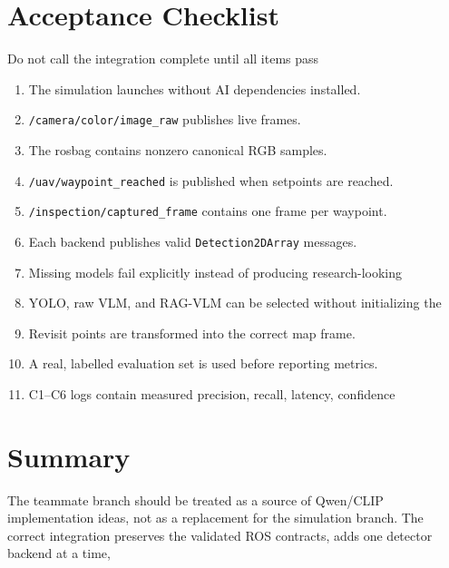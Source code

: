 \documentclass[11pt,a4paper]{article}
\newcommand{\code}[1]{\texttt{\small #1}}
\begin{document}
\section{Acceptance Checklist}

\begin{acceptance}{Do not call the integration complete until all items pass}
\begin{enumerate}[leftmargin=1.2cm]
\item The simulation launches without AI dependencies installed.
\item \code{/camera/color/image\_raw} publishes live frames.
\item The rosbag contains nonzero canonical RGB samples.
\item \code{/uav/waypoint\_reached} is published when setpoints are reached.
\item \code{/inspection/captured\_frame} contains one frame per waypoint.
\item Each backend publishes valid \code{Detection2DArray} messages.
\item Missing models fail explicitly instead of producing research-looking
\item YOLO, raw VLM, and RAG-VLM can be selected without initializing the
\item Revisit points are transformed into the correct map frame.
\item A real, labelled evaluation set is used before reporting metrics.
\item C1--C6 logs contain measured precision, recall, latency, confidence
\end{enumerate}
\end{acceptance}

\section{Summary}

The teammate branch should be treated as a source of Qwen/CLIP implementation
ideas, not as a replacement for the simulation branch. The correct integration
preserves the validated ROS contracts, adds one detector backend at a time,
\end{document}
